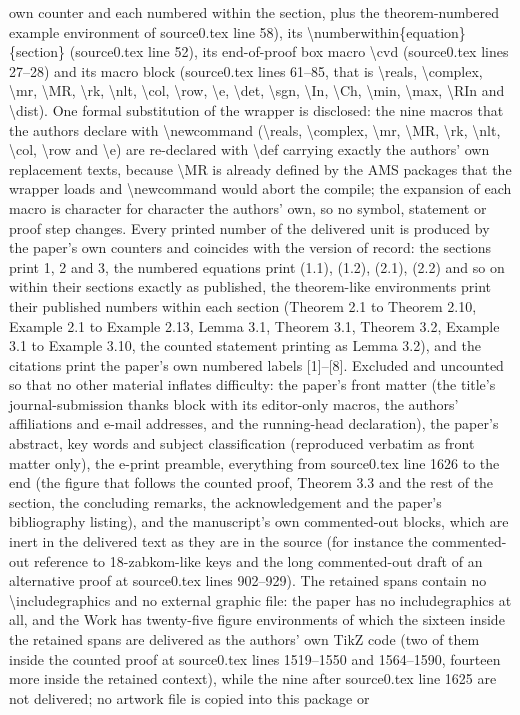 \documentclass[10pt,a4paper]{amsart}
\numberwithin{equation}{section}
\begin{document}
own counter and each numbered within the section, plus the theorem-numbered example environment of source0.tex line 58), its \textbackslash{}numberwithin\{equation\}\{section\} (source0.tex line 52), its end-of-proof box macro \textbackslash{}cvd (source0.tex lines 27--28) and its macro block (source0.tex lines 61--85, that is \textbackslash{}reals, \textbackslash{}complex, \textbackslash{}mr, \textbackslash{}MR, \textbackslash{}rk, \textbackslash{}nlt, \textbackslash{}col, \textbackslash{}row, \textbackslash{}e, \textbackslash{}det, \textbackslash{}sgn, \textbackslash{}In, \textbackslash{}Ch, \textbackslash{}min, \textbackslash{}max, \textbackslash{}RIn and \textbackslash{}dist). One formal substitution of the wrapper is disclosed: the nine macros that the authors declare with \textbackslash{}newcommand (\textbackslash{}reals, \textbackslash{}complex, \textbackslash{}mr, \textbackslash{}MR, \textbackslash{}rk, \textbackslash{}nlt, \textbackslash{}col, \textbackslash{}row and \textbackslash{}e) are re-declared with \textbackslash{}def carrying exactly the authors' own replacement texts, because \textbackslash{}MR is already defined by the AMS packages that the wrapper loads and \textbackslash{}newcommand would abort the compile; the expansion of each macro is character for character the authors' own, so no symbol, statement or proof step changes. Every printed number of the delivered unit is produced by the paper's own counters and coincides with the version of record: the sections print 1, 2 and 3, the numbered equations print (1.1), (1.2), (2.1), (2.2) and so on within their sections exactly as published, the theorem-like environments print their published numbers within each section (Theorem 2.1 to Theorem 2.10, Example 2.1 to Example 2.13, Lemma 3.1, Theorem 3.1, Theorem 3.2, Example 3.1 to Example 3.10, the counted statement printing as Lemma 3.2), and the citations print the paper's own numbered labels [1]--[8]. Excluded and uncounted so that no other material inflates difficulty: the paper's front matter (the title's journal-submission thanks block with its editor-only macros, the authors' affiliations and e-mail addresses, and the running-head declaration), the paper's abstract, key words and subject classification (reproduced verbatim as front matter only), the e-print preamble, everything from source0.tex line 1626 to the end (the figure that follows the counted proof, Theorem 3.3 and the rest of the section, the concluding remarks, the acknowledgement and the paper's bibliography listing), and the manuscript's own commented-out blocks, which are inert in the delivered text as they are in the source (for instance the commented-out reference to 18-zabkom-like keys and the long commented-out draft of an alternative proof at source0.tex lines 902--929). The retained spans contain no \textbackslash{}includegraphics and no external graphic file: the paper has no includegraphics at all, and the Work has twenty-five figure environments of which the sixteen inside the retained spans are delivered as the authors' own TikZ code (two of them inside the counted proof at source0.tex lines 1519--1550 and 1564--1590, fourteen more inside the retained context), while the nine after source0.tex line 1625 are not delivered; no artwork file is copied into this package or 
\end{document}
